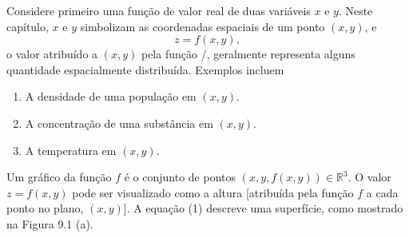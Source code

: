 Considere primeiro uma função de valor real de duas variáveis $x$ e $y$. Neste capítulo, $x$ e $y$ simbolizam as coordenadas espaciais de um ponto $(x, y)$, e
\begin{equation} z = f(x,y), \end{equation}
o valor atribuído a $(x, y)$ pela função /, geralmente representa alguns quantidade espacialmente distribuída. Exemplos incluem

\begin{enumerate}
\item A densidade de uma população em $(x, y)$.
\item A concentração de uma substância em $(x, y)$.
\item A temperatura em $(x, y)$.
\end{enumerate}

Um gráfico da função $f$ é o conjunto de pontos $(x, y, f(x, y)) \in \mathbb {R}^3$. O valor $z = f(x, y)$ pode ser visualizado como a altura [atribuída pela função $ f $ a cada ponto no plano, $(x, y)$]. A equação (1) descreve uma superfície, como mostrado na Figura 9.1 (a).

